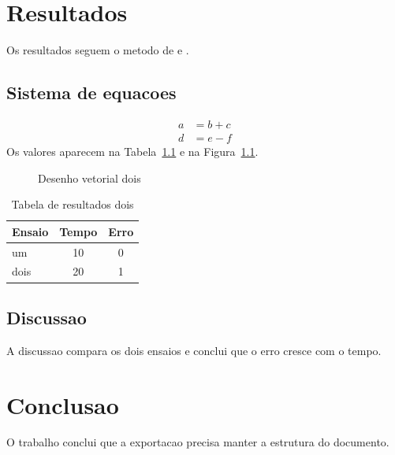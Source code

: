 \chapter{Resultados}
Os resultados seguem o metodo de  e .
\section{Sistema de equacoes}
\begin{align}
a &= b + c \\
d &= e - f
\end{align}
Os valores aparecem na Tabela~\ref{tab:dois} e na Figura~\ref{fig:dois}.
\begin{figure}[htb]
\caption{Desenho vetorial dois}\label{fig:dois}
\end{figure}
\begin{table}[htb]
\caption{Tabela de resultados dois}\label{tab:dois}
\begin{tabular}{lcc}\hline
Ensaio & Tempo & Erro \\ \hline
um & 10 & 0 \\
dois & 20 & 1 \\ \hline
\end{tabular}
\end{table}
\section{Discussao}
A discussao compara os dois ensaios e conclui que o erro cresce com o tempo.
\chapter{Conclusao}
O trabalho conclui que a exportacao precisa manter a estrutura do documento.
